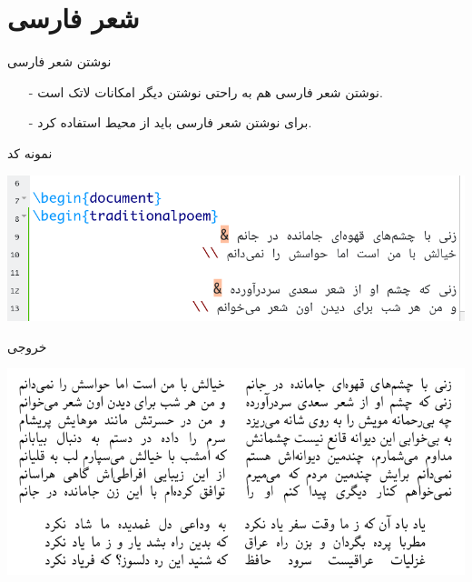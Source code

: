 \section{شعر‌ فارسی}
\begin{frame}{نوشتن شعر فارسی}
\begin{itemize}\itemr
\item[-]
نوشتن شعر فارسی هم به راحتی نوشتن دیگر امکانات لاتک است.

\item[-]
برای نوشتن شعر فارسی باید از محیط 
استفاده کرد.
\end{itemize}
\end{frame}

\begin{frame}[fragile]{نمونه کد}
\begin{center}
\includegraphics[width=\textwidth]{docs/images/tradpoem-code}
\end{center}
\end{frame}

\begin{frame}{خروجی}
\begin{center}
\includegraphics[width=\textwidth]{docs/images/tp-2}
\end{center}
\end{frame}
